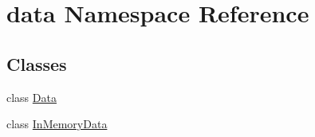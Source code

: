 \hypertarget{namespacedata}{}\section{data Namespace Reference}
\label{namespacedata}
\subsection*{Classes}
\begin{DoxyCompactItemize}
\item 
class \hyperlink{classdata_1_1_data}{Data}
\item 
class \hyperlink{classdata_1_1_in_memory_data}{In\+Memory\+Data}
\end{DoxyCompactItemize}
